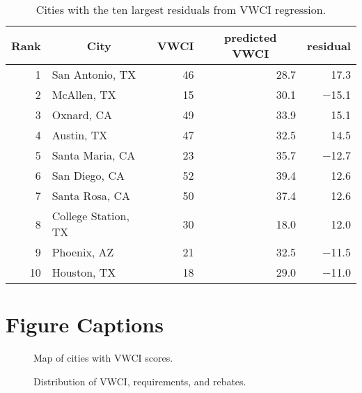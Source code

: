 \documentclass[draft,linenumbers]{agujournal}
\begin{document}
\begin{table}[htbp]
\centering
\caption{Cities with the ten largest residuals from VWCI regression.} 
\label{tab:vwci_top_residuals}
\begin{tabular}{rlrrr}
  \hline
\multicolumn{1}{c}{ Rank } & \multicolumn{1}{c}{ City } & \multicolumn{1}{c}{ VWCI } & \multicolumn{1}{c}{ predicted VWCI } & \multicolumn{1}{c}{ residual } \\ 
  \hline
 1 & San Antonio, TX & 46 & 28.7 & 17.3 \\ 
   2 & McAllen, TX & 15 & 30.1 & $-$15.1 \\ 
   3 & Oxnard, CA & 49 & 33.9 & 15.1 \\ 
   4 & Austin, TX & 47 & 32.5 & 14.5 \\ 
   5 & Santa Maria, CA & 23 & 35.7 & $-$12.7 \\ 
   6 & San Diego, CA & 52 & 39.4 & 12.6 \\ 
   7 & Santa Rosa, CA & 50 & 37.4 & 12.6 \\ 
   8 & College Station, TX & 30 & 18.0 & 12.0 \\ 
   9 & Phoenix, AZ & 21 & 32.5 & $-$11.5 \\ 
  10 & Houston, TX & 18 & 29.0 & $-$11.0 \\ 
   \hline
\end{tabular}
\end{table}


%
%
\clearpage
\section*{Figure Captions}

\begin{figure}[h]
\caption{Map of cities with VWCI scores.}\label{fig:vwci_map}
\end{figure}


\begin{figure}[h]
\caption{Distribution of VWCI, requirements, and rebates.}\label{fig:vwci_histogram}
\end{figure}
\end{document}
